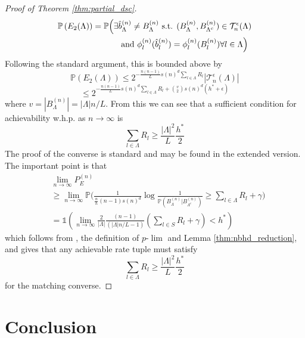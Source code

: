\documentclass[conference,letterpaper]{IEEEtran}
\newcommand{\tti}{\rightarrow\infty}
\newcommand{\prob}[1]{\mathbb{P}\left(#1\right)}
\newcommand{\plim}[0]{p\mbox{-}\lim}
\begin{document}
\begin{proof}[Proof of Theorem \ref{thm:partial_dsc}]
\begin{align}
        \prob{E_2(\Lambda)} = \mathbb{P}\Big(\exists &\hat{b}_\Lambda^{(n)}\neq B_\Lambda^{(n)} \space \text{ s.t. } (B_{\Lambda}^{(n)}, B_{\Lambda^c}^{(n)}) \in \mathcal{T}_n^\epsilon(\Lambda) \nonumber \\ &\text{ and } \phi_l^{(n)}(\hat{b}_l^{(n)}) = \phi_l^{(n)}(B_l^{(n)})\space \forall l \in \Lambda\Big) \nonumber 
    \end{align}
    Following the standard argument, this is bounded above by
    \begin{equation}
        \prob{E_2(\Lambda)} \leq 2^{-\frac{n(n-1)}{L}s(n)^d\sum_{l\in \Lambda}R_l}|\mathcal{T}_n^\epsilon(\Lambda)|
    \end{equation}
    \begin{equation}
        \leq 2^{-\frac{n(n-1)}{L}s(n)^d\sum_{l\in \Lambda}R_l + \binom{v}{2}s(n)^d(h^*+\epsilon)}
    \end{equation}
    where $v = |B_{\Lambda}^{(n)}| = |\Lambda|n/L$. From this we can see that a sufficient condition for achievability w.h.p. as $n\tti$ is
    \begin{equation}
        \sum_{l\in \Lambda} R_l \geq \frac{|\Lambda|^2}{L}\frac{h^*}{2}
    \end{equation}
    The proof of the converse is standard and may be found in the extended version. The important point is that
    \begin{align}
        &\lim_{n\tti} P_E^{(n)} \nonumber \\ &\geq \lim_{n\tti} \mathbb{P}\Big(\frac{1}{{\frac{n}{L}}(n-1)s(n)^d} \log \frac{1}{\mathbb{P}(B_{\Lambda}^{(n)}|B_{\Lambda^c}^{(n)})} \geq \sum_{l \in \Lambda} R_l + \gamma\Big) \nonumber \\
        &= \mathds{1}\left(\lim_{n\tti}\frac{2}{|\Lambda|}\frac{(n-1)}{\left(|\Lambda|n/{L}-1\right)}\left(\sum_{l \in S} R_l + \gamma\right) < h^*\right)
    \end{align}
    which follows from \cite[Lemma 7.2.2]{han_book}, the definition of $\plim$ and Lemma \ref{thm:nbhd_reduction}, and gives that any achievable rate tuple must satisfy
    \begin{equation}
        \sum_{l \in \Lambda} R_l \geq \frac{|\Lambda|^2}{L}\frac{h^*}{2}
    \end{equation}
    for the matching converse.
\end{proof}

\section{Conclusion}
\label{sec:conclusion}
\end{document}
